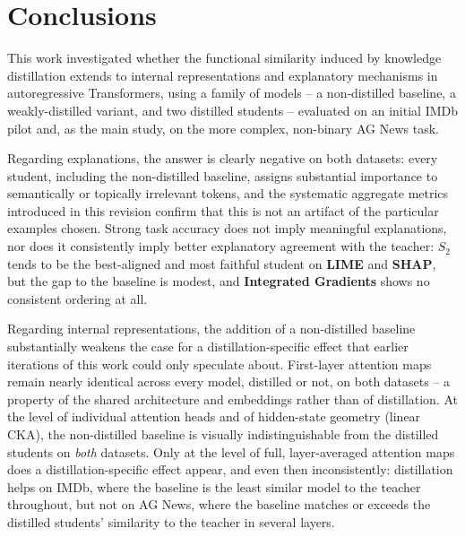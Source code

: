 \documentclass[conference]{IEEEtran}
\begin{document}
\section{Conclusions}

This work investigated whether the functional similarity induced by knowledge distillation extends to internal representations and explanatory mechanisms in autoregressive Transformers, using a family of models -- a non-distilled baseline, a weakly-distilled variant, and two distilled students -- evaluated on an initial IMDb pilot and, as the main study, on the more complex, non-binary AG News task.

Regarding explanations, the answer is clearly negative on both datasets: every student, including the non-distilled baseline, assigns substantial importance to semantically or topically irrelevant tokens, and the systematic aggregate metrics introduced in this revision confirm that this is not an artifact of the particular examples chosen. Strong task accuracy does not imply meaningful explanations, nor does it consistently imply better explanatory agreement with the teacher: $S_2$ tends to be the best-aligned and most faithful student on \textbf{LIME} and \textbf{SHAP}, but the gap to the baseline is modest, and \textbf{Integrated Gradients} shows no consistent ordering at all.

Regarding internal representations, the addition of a non-distilled baseline substantially weakens the case for a distillation-specific effect that earlier iterations of this work could only speculate about. First-layer attention maps remain nearly identical across every model, distilled or not, on both datasets -- a property of the shared architecture and embeddings rather than of distillation. At the level of individual attention heads and of hidden-state geometry (linear CKA), the non-distilled baseline is visually indistinguishable from the distilled students on \emph{both} datasets. Only at the level of full, layer-averaged attention maps does a distillation-specific effect appear, and even then inconsistently: distillation helps on IMDb, where the baseline is the least similar model to the teacher throughout, but not on AG News, where the baseline matches or exceeds the distilled students' similarity to the teacher in several layers.
\end{document}
